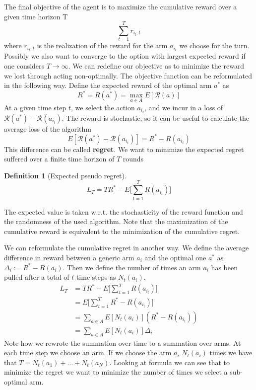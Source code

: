 \documentclass[main.tex]{subfiles}
\newtheorem{definition}{Definition}[section]
\begin{document}
The final objective of the agent is to maximize the cumulative reward over a
given time horizon T
\begin{equation*}
    \sum_{t=1}^T r_{{i_t},t}
\end{equation*}
where $r_{{i_t},t}$ is the realization of the reward for the arm $a_{i_t}$ we choose for the turn. Possibly we also want to converge to the option with largest expected reward if one considers $T \rightarrow \infty$. We can redefine our objective as to minimize the reward we lost through acting non-optimally. The objective function can be reformulated in the following way. Define the expected reward of the optimal arm $a^*$ as
\begin{equation*}
    R^* = R(a^*) = \max_{a \in A} E[\mathcal{R}(a)]
\end{equation*}
At a given time step $t$, we select the action $a_{i_t}$, and we incur in a loss of $\mathcal{R}(a^*) - \mathcal{R}(a_{i_t})$. The reward is stochastic, so it can be useful to calculate the average loss of the algorithm
\begin{equation*}
    E[\mathcal{R}(a^*) - \mathcal{R}(a_{i_t})] = R^* - R(a_{i_t})
\end{equation*}
This difference can be called \textbf{regret}.
We want to minimize the expected regret suffered over a finite time horizon of $T$ rounds
\begin{definition}[Expected pseudo regret]
    \begin{equation*}
        L_T = TR^* - E \bigg[ \sum_{t=1}^T R(a_{i_t}) \bigg]
    \end{equation*}
\end{definition}
\par \noindent
The expected value is taken w.r.t. the stochasticity of the reward function and the randomness of the used algorithm. Note that the maximization of the cumulative reward is equivalent to the minimization of the cumulative regret.

We can reformulate the cumulative regret in another way.
We define the average difference in reward between a generic arm $a_i$ and the optimal one $a^*$ as $\Delta_i := R^*-R(a_i)$. Then we define the number of times an arm $a_i$ has been pulled after a total of $t$ time steps as $N_t(a_i)$.
\begin{align*}
    L_T & = TR^* - E \bigg[ \sum_{t=1}^T R(a_{i_t}) \bigg] \\
        & = E \bigg[ \sum_{t=1}^T R^* - R(a_{i_t}) \bigg]  \\
        & = \sum_{a \in A} E[N_t(a_i)](R^* - R(a_{i_t}))   \\
        & = \sum_{a \in A} E[N_t(a_i)] \Delta_i
\end{align*}
Note how we rewrote the summation over time to a summation over arms. At each time step we choose an arm. If we choose the arm $a_i$ $N_t(a_i)$ times we have that $T= N_t(a_1) + \dots + N_t(a_N)$. Looking at formula we can see that to minimize the regret we want to minimize the number of times we select a sub-optimal arm.
\end{document}

